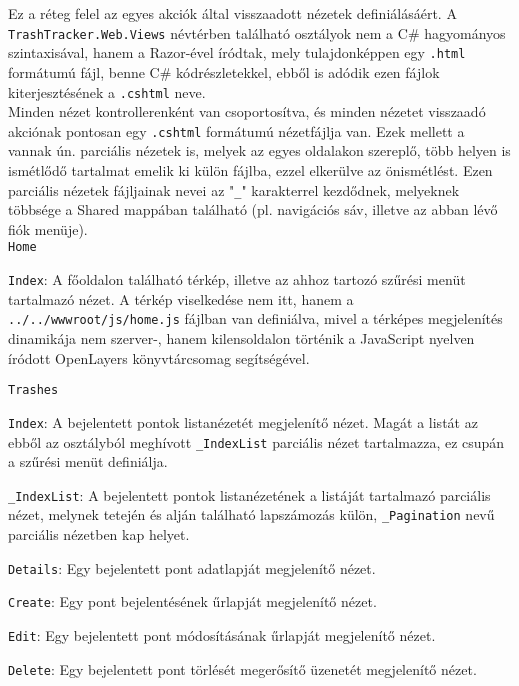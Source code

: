Ez a réteg felel az egyes akciók által visszaadott nézetek definiálásáért. A \texttt{TrashTracker.Web.Views} névtérben található osztályok nem a C\# hagyományos szintaxisával, hanem a Razor-ével íródtak, mely tulajdonképpen egy \texttt{.html} formátumú fájl, benne C\# kódrészletekkel, ebből is adódik ezen fájlok kiterjesztésének a \texttt{.cshtml} neve.\\
Minden nézet kontrollerenként van csoportosítva, és minden nézetet visszaadó akciónak pontosan egy \texttt{.cshtml} formátumú nézetfájlja van. Ezek mellett a vannak ún. parciális nézetek is, melyek az egyes oldalakon szereplő, több helyen is ismétlődő tartalmat emelik ki külön fájlba, ezzel elkerülve az önismétlést. Ezen parciális nézetek fájljainak nevei az "\texttt{\_}" karakterrel kezdődnek, melyeknek többsége a Shared mappában található (pl. navigációs sáv, illetve az abban lévő fiók menüje).\\
\texttt{Home}
\begin{compactitem}
	\item \texttt{Index}: A főoldalon található térkép, illetve az ahhoz tartozó szűrési menüt tartalmazó nézet. A térkép viselkedése nem itt, hanem a \texttt{../../wwwroot/js/home.js} fájlban van definiálva, mivel a térképes megjelenítés dinamikája nem szerver-, hanem kilensoldalon történik a JavaScript nyelven íródott OpenLayers könyvtárcsomag segítségével.
\end{compactitem}
\texttt{Trashes}
\begin{compactitem}
	\item \texttt{Index}: A bejelentett pontok listanézetét megjelenítő nézet. Magát a listát az ebből az osztályból meghívott \texttt{\_IndexList} parciális nézet tartalmazza, ez csupán a szűrési menüt definiálja.
	\begin{compactitem}
		\item \texttt{\_IndexList}: A bejelentett pontok listanézetének a listáját tartalmazó parciális nézet, melynek tetején és alján található lapszámozás külön, \texttt{\_Pagination} nevű parciális nézetben kap helyet.
	\end{compactitem}
	\item \texttt{Details}: Egy bejelentett pont adatlapját megjelenítő nézet.
	\item \texttt{Create}: Egy pont bejelentésének űrlapját megjelenítő nézet.
	\item \texttt{Edit}: Egy bejelentett pont módosításának űrlapját megjelenítő nézet.
	\item \texttt{Delete}: Egy bejelentett pont törlését megerősítő üzenetét megjelenítő nézet.
\end{compactitem}
